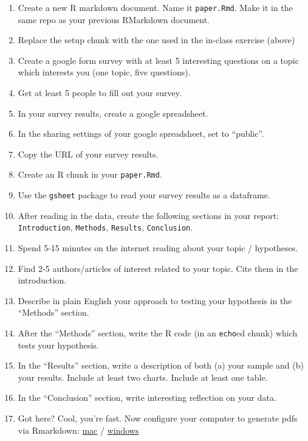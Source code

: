 \documentclass[
]{book}
\begin{document}
\begin{enumerate}
\def\labelenumi{\arabic{enumi}.}
\item
  Create a new R markdown document. Name it \texttt{paper.Rmd}. Make it in the same repo as your previous RMarkdown document.
\item
  Replace the setup chunk with the one used in the in-class exercise (above)
\item
  Create a google form survey with at least 5 interesting questions on a topic which interests you (one topic, five questions).
\item
  Get at least 5 people to fill out your survey.
\item
  In your survey results, create a google spreadsheet.
\item
  In the sharing settings of your google spreadsheet, set to ``public''.
\item
  Copy the URL of your survey results.
\item
  Create an R chunk in your \texttt{paper.Rmd}.
\item
  Use the \texttt{gsheet} package to read your survey results as a dataframe.
\item
  After reading in the data, create the following sections in your report: \texttt{Introduction}, \texttt{Methods}, \texttt{Results}, \texttt{Conclusion}.
\item
  Spend 5-15 minutes on the internet reading about your topic / hypotheses.
\item
  Find 2-5 authors/articles of interest related to your topic. Cite them in the introduction.
\item
  Describe in plain English your approach to testing your hypothesis in the ``Methods'' section.
\item
  After the ``Methods'' section, write the R code (in an \texttt{echo}ed chunk) which tests your hypothesis.
\item
  In the ``Results'' section, write a description of both (a) your sample and (b) your results. Include at least two charts. Include at least one table.
\item
  In the ``Conclusion'' section, write interesting reflection on your data.
\item
  Got here? Cool, you're fast. Now configure your computer to generate pdfs via Rmarkdown: \href{https://medium.com/@sorenlind/create-pdf-reports-using-r-r-markdown-latex-and-knitr-on-macos-high-sierra-e7b5705c9fd}{mac} / \href{https://medium.com/@sorenlind/create-pdf-reports-using-r-r-markdown-latex-and-knitr-on-windows-10-952b0c48bfa9}{windows}

\end{enumerate}
\end{document}
